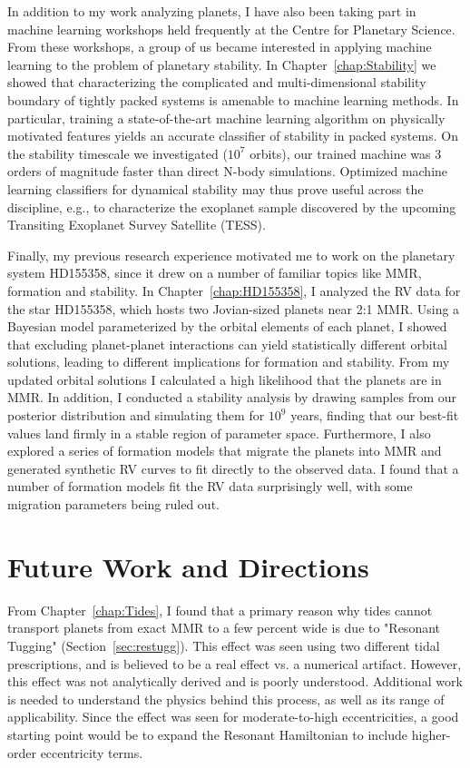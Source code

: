 In addition to my work analyzing \kep planets, I have also been taking part in machine learning workshops held frequently at the Centre for Planetary Science. 
From these workshops, a group of us became interested in applying machine learning to the problem of planetary stability. 
In Chapter~\ref{chap:Stability} we showed that characterizing the complicated and multi-dimensional stability boundary of tightly packed systems is amenable to machine learning methods. 
In particular, training a state-of-the-art machine learning algorithm on physically motivated features yields an accurate classifier of stability in packed systems. 
On the stability timescale we investigated ($10^7$ orbits), our trained machine was 3 orders of magnitude faster than direct N-body simulations. 
Optimized machine learning classifiers for dynamical stability may thus prove useful across the discipline, e.g., to characterize the exoplanet sample discovered by the upcoming Transiting Exoplanet Survey Satellite (TESS).

Finally, my previous research experience motivated me to work on the planetary system HD155358, since it drew on a number of familiar topics like MMR, formation and stability. 
In Chapter~\ref{chap:HD155358}, I analyzed the RV data for the star HD155358, which hosts two Jovian-sized planets near 2:1 MMR. 
Using a Bayesian model parameterized by the orbital elements of each planet, I showed that excluding planet-planet interactions can yield statistically different orbital solutions, leading to different implications for formation and stability. 
From my updated orbital solutions I calculated a high likelihood that the planets are in MMR. 
In addition, I conducted a stability analysis by drawing samples from our posterior distribution and simulating them for $10^9$ years, finding that our best-fit values land firmly in a stable region of parameter space.
Furthermore, I also explored a series of formation models that migrate the planets into MMR and generated synthetic RV curves to fit directly to the observed data. 
I found that a number of formation models fit the RV data surprisingly well, with some migration parameters being ruled out.

\section{Future Work and Directions}
\label{sec:Future}
From Chapter~\ref{chap:Tides}, I found that a primary reason why tides cannot transport planets from exact MMR to a few percent wide is due to "Resonant Tugging" (Section~\ref{sec:restugg}).
This effect was seen using two different tidal prescriptions, and is believed to be a real effect vs. a numerical artifact. 
However, this effect was not analytically derived and is poorly understood. 
Additional work is needed to understand the physics behind this process, as well as its range of applicability.
Since the effect was seen for moderate-to-high eccentricities, a good starting point would be to expand the Resonant Hamiltonian to include higher-order eccentricity terms. 

